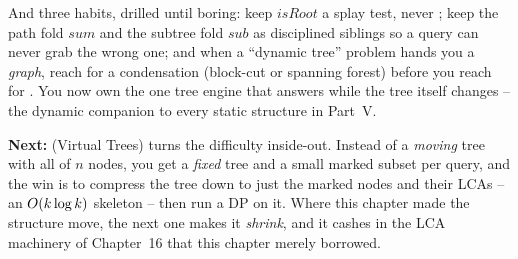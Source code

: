 \begin{lastword}
\medskip
And three habits, drilled until boring: keep \(\mathit{isRoot}\) a splay test, never ; keep
the path fold \(\mathit{sum}\) and the subtree fold \(\mathit{sub}\) as disciplined siblings so a query
can never grab the wrong one; and when a ``dynamic tree'' problem hands you a \emph{graph}, reach for a
condensation (block-cut or spanning forest) before you reach for . You now own the one
tree engine that answers while the tree itself changes -- the dynamic companion to every static
structure in Part~V.

\medskip
\textbf{Next:}  (Virtual Trees) turns the difficulty inside-out. Instead of a
\emph{moving} tree with all of \(n\) nodes, you get a \emph{fixed} tree and a small marked subset per
query, and the win is to compress the tree down to just the marked nodes and their LCAs -- an
\(O(k\log k)\) skeleton -- then run a DP on it. Where this chapter made the structure move, the
next one makes it \emph{shrink}, and it cashes in the LCA machinery of Chapter~16 that this chapter
merely borrowed.
\end{lastword}
